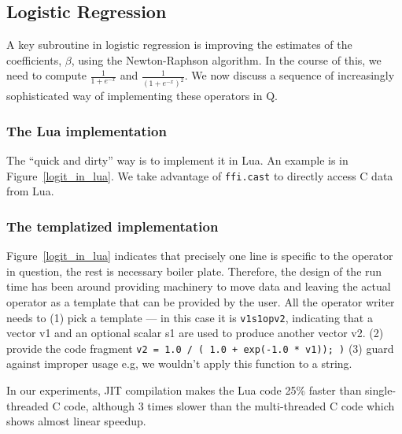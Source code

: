 \subsection{Logistic Regression}

A key subroutine in logistic regression \cite{Hastie2009} is improving the 
estimates of the
coefficients, \(\beta\), using the Newton-Raphson algorithm.
In the course of this, we need to compute
\(\frac{1}{1 + e^{-x}}\) and 
\(\frac{1}{(1 + e^{-x})^2}\).
We now discuss a sequence of increasingly sophisticated way of implementing
these operators in Q.

\subsubsection{The Lua implementation}
\label{Logit_Lua}
The ``quick and dirty'' way is to implement it in Lua. An example is 
in Figure~\ref{logit_in_lua}. We take advantage of {\tt ffi.cast}
to directly access C data from Lua.
\begin{figure}
\centering
{}
\end{figure}

\subsubsection{The templatized implementation}
\label{Logit_template}
Figure~\ref{logit_in_lua} indicates that precisely one line is specific to the
operator in question, the rest is necessary boiler plate. Therefore, the design
of the run time has been around providing machinery to move data and leaving
the actual operator as a template that can be provided by the user. All the operator
writer needs to (1) pick a template --- in this case it is {\tt v1s1opv2}, indicating that a
vector v1 and an optional scalar s1 are used to produce another vector v2.
(2) provide the code fragment {\tt  v2 = 1.0 / ( 1.0 + exp(-1.0 * v1)); )} (3)
guard against improper usage e.g, we wouldn't apply this function to a string.

In our experiments, 
JIT compilation makes the Lua code 25\% faster than single-threaded C code,
although 3 times slower than the multi-threaded C code which shows almost linear
speedup.

